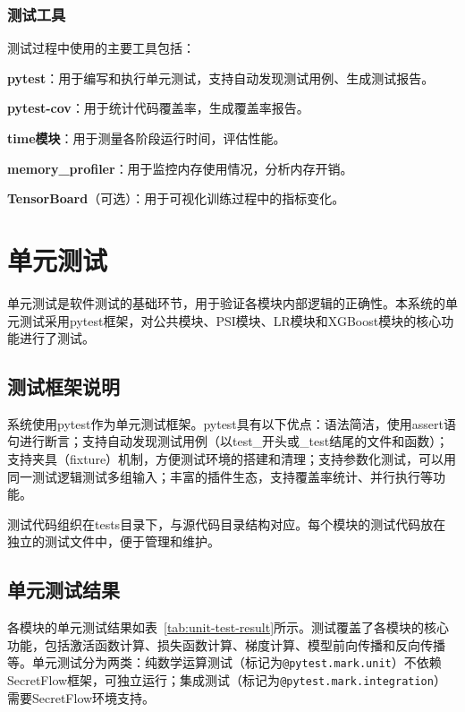 \subsubsection{测试工具}

测试过程中使用的主要工具包括：

\textbf{pytest}：用于编写和执行单元测试，支持自动发现测试用例、生成测试报告。

\textbf{pytest-cov}：用于统计代码覆盖率，生成覆盖率报告。

\textbf{time模块}：用于测量各阶段运行时间，评估性能。

\textbf{memory\_profiler}：用于监控内存使用情况，分析内存开销。

\textbf{TensorBoard}（可选）：用于可视化训练过程中的指标变化。

\section{单元测试}
\label{sec:unit-test}

单元测试是软件测试的基础环节，用于验证各模块内部逻辑的正确性。本系统的单元测试采用pytest框架，对公共模块、PSI模块、LR模块和XGBoost模块的核心功能进行了测试。

\subsection{测试框架说明}

系统使用pytest作为单元测试框架。pytest具有以下优点：语法简洁，使用assert语句进行断言；支持自动发现测试用例（以test\_开头或\_test结尾的文件和函数）；支持夹具（fixture）机制，方便测试环境的搭建和清理；支持参数化测试，可以用同一测试逻辑测试多组输入；丰富的插件生态，支持覆盖率统计、并行执行等功能。

测试代码组织在tests目录下，与源代码目录结构对应。每个模块的测试代码放在独立的测试文件中，便于管理和维护。

\subsection{单元测试结果}

各模块的单元测试结果如表~\ref{tab:unit-test-result}所示。测试覆盖了各模块的核心功能，包括激活函数计算、损失函数计算、梯度计算、模型前向传播和反向传播等。单元测试分为两类：纯数学运算测试（标记为\texttt{@pytest.mark.unit}）不依赖SecretFlow框架，可独立运行；集成测试（标记为\texttt{@pytest.mark.integration}）需要SecretFlow环境支持。

